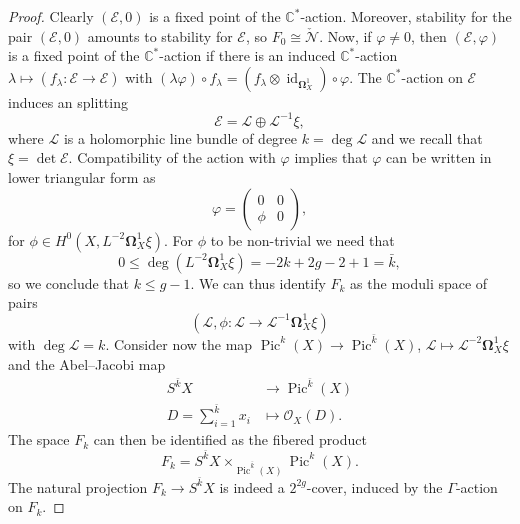 \documentclass[10pt,a4paper]{amsart}
\DeclareMathOperator{\Pic}{Pic}
\DeclareMathOperator{\id}{id}
\newcommand{\C}{\mathbb C}
\newcommand{\cN}{\mathcal N}
\newcommand{\sE}{\mathscr E}
\newcommand{\sL}{\mathscr L}
\newcommand{\sO}{\mathscr O}
\begin{document}
\begin{proof}
  Clearly $(\sE,0)$ is a fixed point of the $\C^*$-action. Moreover, stability for the pair $(\sE,0)$ amounts to stability for $\sE$, so $F_0\cong \check{\cN}$. Now, if $\varphi \neq 0$, then $(\sE,\varphi)$ is a fixed point of the $\C^*$-action if there is an induced $\C^*$-action $\lambda \mapsto (f_\lambda: \sE \rightarrow \sE)$ with $(\lambda \varphi) \circ f_\lambda = (f_\lambda \otimes \id_{\bm{\Omega}^1_X}) \circ \varphi$. The $\C^*$-action on $\sE$ induces an splitting
  \begin{equation*}
\sE = \sL \oplus \sL^{-1} \xi,
  \end{equation*}
  where $\sL$ is a holomorphic line bundle of degree $k=\deg \sL$ and we recall that $\xi=\det \sE$. Compatibility of the action with $\varphi$ implies that $\varphi$ can be written in lower triangular form as
  \begin{equation*}
    \varphi =
    \begin{pmatrix}
      0 & 0 \\
      \phi & 0
    \end{pmatrix},
  \end{equation*}
  for $\phi \in H^0(X,L^{-2}\bm{\Omega}^1_X \xi)$. For $\phi$ to be non-trivial we need that
  \begin{equation*}
0 \leq \deg (L^{-2}\bm{\Omega}^1_X \xi) =-2k + 2g-2 + 1= \bar{k},
  \end{equation*}
  so we conclude that $k \leq g -1$. We can thus identify $F_k$ as the moduli space of pairs
  \begin{equation*}
(\sL,\phi: \sL \rightarrow \sL^{-1} \bm{\Omega}^1_X \xi)
  \end{equation*}
  with $\deg \sL = k$. Consider now the map $\Pic^{k}(X)\rightarrow \Pic^{\bar{k}}(X)$, $\sL \mapsto \sL^{-2} \bm{\Omega}^1_X \xi$ and the Abel--Jacobi map
  \begin{align*}
    S^{\bar{k}} X & \longrightarrow  \Pic^{\bar{k}}(X) \\
    D=\sum_{i=1}^{\bar{k}} x_i  & \longmapsto \sO_X(D).
  \end{align*}
The space $F_k$ can then be identified as the fibered product
\begin{equation*}
F_k = S^{\bar{k}} X \times_{\Pic^{\bar{k}}(X)} \Pic^k(X).
\end{equation*}
The natural projection $F_k \rightarrow S^{\bar{k}} X$ is indeed a $2^{2g}$-cover, induced by the $\Gamma$-action on $F_k$.
\end{proof}
\end{document}
